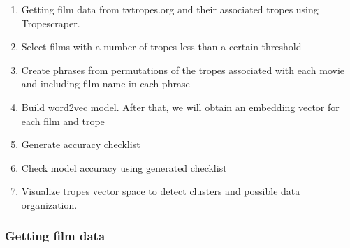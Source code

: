 \documentclass[letterpaper]{article}
\begin{document}
	\begin{enumerate}
	\item Getting film data from tvtropes.org and their associated tropes using Tropescraper. %
	\item Select films with a number of tropes less than a certain threshold
	\item Create phrases from permutations of the tropes associated with each movie and including film name in each phrase
	\item Build word2vec model. After that, we will obtain an embedding vector for each film and trope
	\item Generate accuracy checklist  %
	\item Check model accuracy using generated checklist
	\item Visualize tropes vector space to detect clusters and possible data organization.
	\end{enumerate}


    \subsubsection{Getting film data}
		
\end{document}
